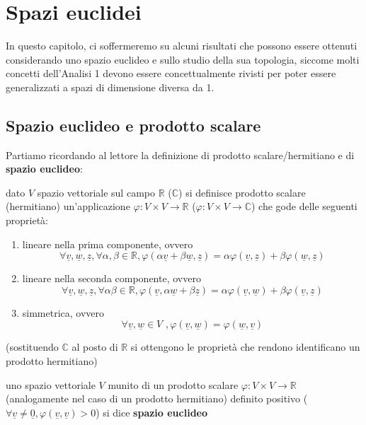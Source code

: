 \chapter{Spazi euclidei}
	In questo capitolo, ci soffermeremo su alcuni risultati che possono essere ottenuti considerando uno spazio euclideo e sullo studio della sua topologia, siccome molti concetti dell'Analisi 1 devono essere concettualmente rivisti per poter essere generalizzati a spazi di dimensione diversa da 1.
	\section{Spazio euclideo e prodotto scalare}
	Partiamo ricordando al lettore la definizione di prodotto scalare/hermitiano e di \textbf{spazio euclideo}:
	\begin{definition}
	dato $V$ spazio vettoriale sul campo $\mathbb{R}$ ($\mathbb{C}$) si definisce prodotto scalare (hermitiano) un'applicazione $\varphi: V \times V \to \mathbb{R}$ ($\varphi: V \times V \to \mathbb{C}$) che gode delle seguenti proprietà:
	\begin{enumerate}[label=\protect\circled{\arabic*}]
		\item lineare nella prima componente, ovvero
		$$
		\forall \underline{v}, \underline{w}, \underline{z}, \forall \alpha, \beta \in \mathbb{R}, \varphi(\alpha \underline{v} + \beta \underline{w}, \underline{z}) = \alpha \varphi(\underline{v}, \underline{z}) + \beta \varphi(\underline{w}, \underline{z})
		$$
		\item lineare nella seconda componente, ovvero
		$$
		\forall \underline{v}, \underline{w}, \underline{z}, \forall \alpha \beta \in \mathbb{R}, \varphi(\underline{v}, \alpha \underline{w} + \beta \underline{z}) = \alpha \varphi(\underline{v}, \underline{w}) + \beta \varphi(\underline{v}, \underline{z})
		$$
		\item simmetrica, ovvero
		$$
		\forall \underline{v}, \underline{w} \in V \, \, , \varphi(\underline{v}, \underline{w}) = \varphi(\underline{w}, \underline{v})
		$$
	\end{enumerate}
	(sostituendo $\mathbb{C}$ al posto di $\mathbb{R}$ si ottengono le proprietà che rendono identificano un prodotto hermitiano)
	\end{definition}
	\begin{definition}
		uno spazio vettoriale $V$ munito di un prodotto scalare $\varphi: V \times V \to \mathbb{R}$ (analogamente nel caso di un prodotto hermitiano) definito positivo ($\forall \underline{v} \neq \underline{0}, \varphi(\underline{v}, \underline{v}) > 0$) si dice \textbf{spazio euclideo}
	\end{definition}
